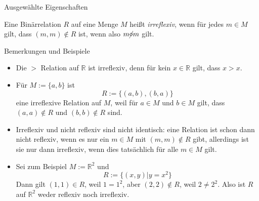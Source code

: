 \documentclass[
  8pt,
  ignorenonframetext,
]{beamer}
\providecommand{\tightlist}{%
  \setlength{\itemsep}{0pt}\setlength{\parskip}{0pt}}
\begin{document}
\begin{frame}{Ausgewählte Eigenschaften}
\protect\hypertarget{ausgewuxe4hlte-eigenschaften-3}{}
\footnotesize
\begin{definition}[Irreflexivität]
\justifying
Eine Binärrelation $R$ auf eine Menge $M$ heißt \textit{irreflexiv}, wenn für
jedes $m \in M$ gilt, dass $(m,m)\notin R$ ist, wenn also $m \cancel{\diamond} m$ gilt.
\end{definition}

Bemerkungen und Beispiele

\begin{itemize}
\tightlist
\item
  Die \(>\) Relation auf \(\mathbb{R}\) ist irreflexiv, denn für kein
  \(x \in \mathbb{R}\) gilt, dass \(x > x\).
\item
  Für \(M := \{a,b\}\) ist \begin{equation}
  R := \{(a,b), (b,a)\}
  \end{equation} eine irreflexive Relation auf \(M\), weil für
  \(a \in M\) und \(b \in M\) gilt, dass \((a,a)\notin R\) und
  \((b,b)\notin R\) sind.
\item
  Irreflexiv und nicht reflexiv sind nicht identisch: eine Relation ist
  schon dann nicht reflexiv, wenn es nur ein \(m \in M\) mit
  \((m,m)\notin R\) gibt, allerdings ist sie nur dann irreflexiv, wenn
  dies tatsächlich für alle \(m \in M\) gilt.
\item
  Sei zum Beispiel \(M := \mathbb{R}^2\) und \begin{equation}
  R := \{(x,y)|y = x^2\}
  \end{equation} Dann gilt \((1,1) \in R\), weil \(1 = 1^2\), aber
  \((2,2) \notin R\), weil \(2 \neq 2^2\). Also ist \(R\) auf
  \(\mathbb{R}^2\) weder reflexiv noch irreflexiv.
\end{itemize}
\end{frame}
\end{document}
